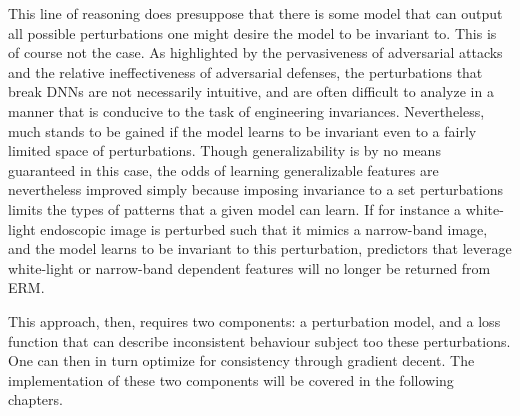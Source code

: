 This line of reasoning does presuppose that there is some model that can output all possible perturbations one might desire the model to be invariant to. This is of course not the case. As highlighted by the pervasiveness of adversarial attacks and the relative ineffectiveness of adversarial defenses, the perturbations that break DNNs are not necessarily intuitive, and are often difficult to analyze in a manner that is conducive to the task of engineering invariances. Nevertheless, much stands to be gained if the model learns to be invariant even to a fairly limited space of perturbations. Though generalizability is by no means guaranteed in this case, the odds of learning generalizable features are nevertheless improved simply because imposing invariance to a set perturbations limits the types of patterns that a given model can learn. If for instance a white-light endoscopic image is perturbed such that it mimics a narrow-band image, and the model learns to be invariant to this perturbation, predictors that leverage white-light or narrow-band dependent features will no longer be returned from ERM.

This approach, then, requires two components: a perturbation model, and a loss function that can describe inconsistent behaviour subject too these perturbations. One can then in turn optimize for consistency through gradient decent. The implementation of these two components will be covered in the following chapters.
    
